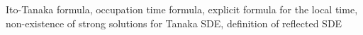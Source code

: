 Ito-Tanaka formula, occupation time formula, explicit formula for the local time, non-existence of strong solutions for Tanaka SDE, definition of reflected SDE